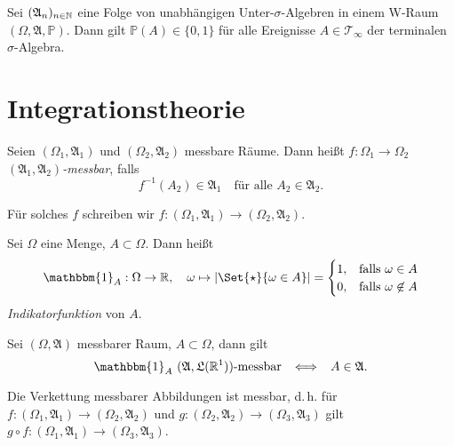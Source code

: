 \documentclass{cheat-sheet}
\newcommand{\Alg}{\mathfrak{A}} %
\newcommand{\LebAlg}{\mathfrak{L}} %
\renewcommand{\P}{\mathbb{P}}
\newcommand{\ind}{\mathbbm{1}} %
\begin{document}

\begin{satz}
  Sei $(\Alg_n)_{n \in \N}$ eine Folge von unabhängigen Unter-$\sigma$-Algebren in einem W-Raum $(\Omega, \Alg, \P)$. Dann gilt $\P(A) \in \{ 0, 1 \}$ für alle Ereignisse $A \in \mathcal{T}_\infty$ der terminalen $\sigma$-Algebra.
\end{satz}


\section{Integrationstheorie}


\begin{defn}
  Seien $(\Omega_1, \Alg_1)$ und $(\Omega_2, \Alg_2)$ messbare Räume. Dann heißt $f : \Omega_1 \to \Omega_2$ \emph{$(\Alg_1, \Alg_2)$-messbar}, falls
  \[ f^{-1}(A_2) \in \Alg_1 \quad \text{für alle } A_2 \in \Alg_2. \]
\end{defn}

\begin{nota}
  Für solches $f$ schreiben wir $f : (\Omega_1, \Alg_1) \to (\Omega_2, \Alg_2)$.
\end{nota}

\begin{nota}
  Sei $\Omega$ eine Menge, $A \subset \Omega$. Dann heißt
  \[ \ind_A : \Omega \to \R, \quad \omega \mapsto \abs{\Set{ \star }{ \omega \in A }} =
  \begin{cases}
    1, & \text{falls } \omega \in A \\
    0, & \text{falls } \omega \not\in A
  \end{cases} \]
  \emph{Indikatorfunktion} von $A$.
\end{nota}

\begin{beobachtung}
  Sei $(\Omega, \Alg)$ messbarer Raum, $A \subset \Omega$, dann gilt
  \[ \ind_A \text{ $(\Alg, \LebAlg(\R^1))$-messbar} \enspace \iff \enspace A \in \Alg. \]
\end{beobachtung}



\begin{lem}
  Die Verkettung messbarer Abbildungen ist messbar, d.\,h. für $f : (\Omega_1, \Alg_1) \to (\Omega_2, \Alg_2)$ und $g : (\Omega_2, \Alg_2) \to (\Omega_3, \Alg_3)$ gilt $g \circ f : (\Omega_1, \Alg_1) \to (\Omega_3, \Alg_3)$.
\end{lem}
\end{document}
